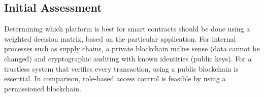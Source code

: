 \newpage 
\subsection{Initial Assessment}



Determining which platform is best for smart contracts should be done using a weighted decision matrix, based on the particular application. For internal processes such as supply chains, a private blockchain makes sense (data cannot be changed) and cryptographic auditing with known identities (public keys). For a trustless system that verifies every transaction, using a public blockchain is essential. In comparison, role-based access control is feasible by using a permissioned blockchain. \hfill \break


